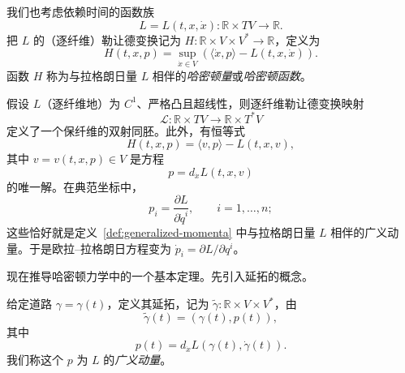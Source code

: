 我们也考虑依赖时间的函数族
\[
  L=L(t,x,\dot x):\mathbb R\times TV\to\mathbb R.
\]
把 $L$ 的（逐纤维）勒让德变换记为 $H:\mathbb R\times V\times V^*\to\mathbb R$，定义为
\begin{equation}\label{eq:fiberwise-legendre-hamiltonian}
  H(t,x,p)=\sup_{\dot x\in V}
  (\langle\dot x,p\rangle-L(t,x,\dot x)).
\end{equation}
函数 $H$ 称为与拉格朗日量 $L$ 相伴的\emph{哈密顿量}或\emph{哈密顿函数}。

假设 $L$（逐纤维地）为 $C^1$、严格凸且超线性，则逐纤维勒让德变换映射
\[
  \mathcal L:\mathbb R\times TV\to\mathbb R\times T^*V
\]
定义了一个保纤维的双射同胚。此外，有恒等式
\begin{equation}\label{eq:hamiltonian-from-lagrangian}
  H(t,x,p)=\langle v,p\rangle-L(t,x,v),
\end{equation}
其中 $v=v(t,x,p)\in V$ 是方程
\begin{equation}\label{eq:fiberwise-legendre-equation}
  p=d_{\dot x}L(t,x,v)
\end{equation}
的唯一解。在典范坐标中，
\[
  p_i=\frac{\partial L}{\partial\dot q^i},
  \qquad i=1,\ldots,n;
\]
这些恰好就是定义~\ref{def:generalized-momenta} 中与拉格朗日量 $L$ 相伴的广义动量。于是欧拉--拉格朗日方程变为 $\dot p_i=\partial L/\partial q^i$。

现在推导哈密顿力学中的一个基本定理。先引入延拓的概念。

\begin{definition}
\label{def:prolongation}
给定道路 $\gamma=\gamma(t)$，定义其延拓，记为 $\widetilde\gamma:\mathbb R\times V\times V^*$，由
\[
  \widetilde\gamma(t)=(\gamma(t),p(t)),
\]
其中
\[
  p(t)=d_{\dot x}L(\gamma(t),\dot\gamma(t)).
\]
我们称这个 $p$ 为 $L$ 的\emph{广义动量}。
\end{definition}

